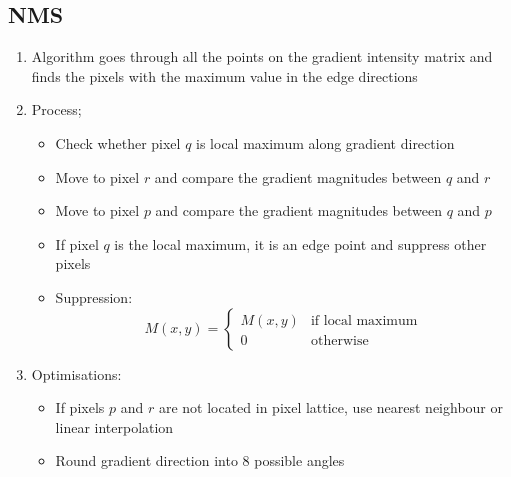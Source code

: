 \documentclass[9pt]{article}
\begin{document}
\begin{multicols*}{2}
        \subsection{NMS}
        \begin{enumerate}
            \item Algorithm goes through all the points on the gradient intensity matrix and finds the pixels with the maximum value in the edge directions
            \item Process;
            \begin{itemize}
                \item Check whether pixel $q$ is local maximum along gradient direction 
                \item Move to pixel $r$ and compare the gradient magnitudes between $q$ and $r$ 
                \item Move to pixel $p$ and compare the gradient magnitudes between $q$ and $p$ 
                \item If pixel $q$ is the local maximum, it is an edge point and suppress other pixels 
                \item Suppression:
                $$
                    M(x,y) = \begin{cases}
                        M(x,y) & \text{if local maximum} \\
                        0 & \text{otherwise}
                    \end{cases}
                $$
            \end{itemize}

            \item Optimisations:
            \begin{itemize}
                \item If pixels $p$ and $r$ are not located in pixel lattice, use nearest neighbour or linear interpolation 
                \item Round gradient direction into 8 possible angles 
            \end{itemize}
        \end{enumerate}


\end{multicols*}
\end{document}
